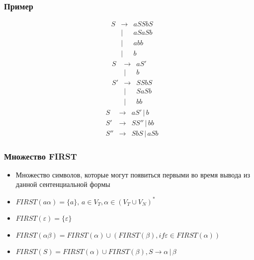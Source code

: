 \documentclass{beamer}
\begin{document}
\begin{frame}[fragile]
  \transwipe[direction=90]
  \frametitle{Пример}
  $$
  \begin{array}{crcl}
  &S& \rightarrow & a S S b S \\
  & &           | & a S a S b \\
  & &           | & a b b \\
  & &           | & b 
  \end{array}
  $$
 \pause
  $$
  \begin{array}{crcl}
  &S & \rightarrow & a S' \\
  &  &           | & b \\
  
  &S'& \rightarrow & S S b S \\
  &  &           | & S a S b \\
  &  &           | & b b 
  \end{array}
  $$ 
  \pause
  $$
  \begin{array}{crcl}
  &S  & \rightarrow & a S' \, | \, b \\
  
  &S' & \rightarrow & S S'' \, | \, b b \\
  
  &S''& \rightarrow & S b S \, | \, a S b 
  \end{array}
  $$
\end{frame}

\begin{frame}[fragile]
  \transwipe[direction=90]
  \frametitle{Множество FIRST}
  \begin{itemize}
   \item Множество символов, которые могут появиться первыми во время вывода из данной сентенциальной формы
   \item $FIRST(a \alpha) = \{ a \}, \, a \in V_T, \alpha \in (V_T \cup V_N)^*$
   \item $FIRST(\varepsilon) = \{ \varepsilon \}$
   \item $FIRST(\alpha \beta) = FIRST(\alpha) \cup (FIRST(\beta), if \varepsilon \in FIRST(\alpha))$
   \item $FIRST(S) = FIRST(\alpha) \cup FIRST(\beta), S \rightarrow \alpha \, | \, \beta $
  \end{itemize}
\end{frame}
\end{document}

